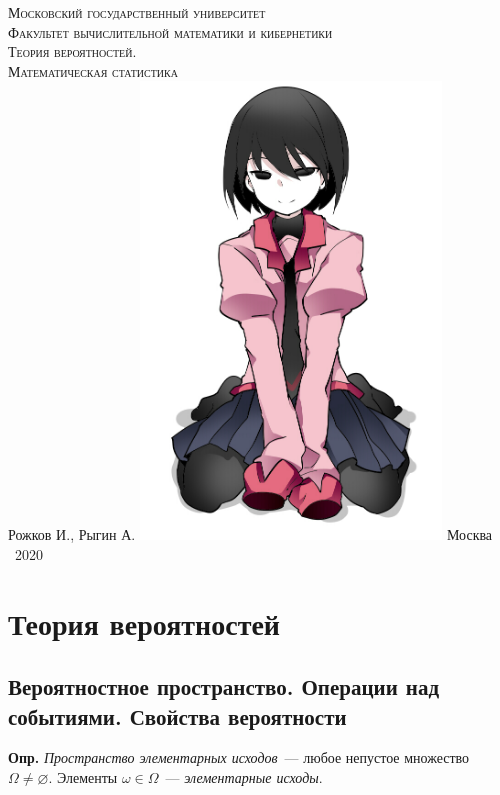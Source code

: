 \documentclass[oneside,final,14pt]{extreport}
\newcommand\mydef{{\bf Опр.}}
\theoremstyle{definition}
\begin{document}
\begin{titlepage}
    \centering
    \vfill
    {\scshape\large
        Московский государственный университет\\
        Факультет вычислительной математики и кибернетики\\
    }
    \vskip1cm
    {\scshape\huge
        Теория вероятностей.\\
        Математическая статистика\\
    }
    \vskip0.5cm
    {\upshape\large
        Рожков И., Рыгин А.
    }    
    \vfill
    \includegraphics[width=8cm]{pic.png}
    \vfill
    {\upshape\large
        Москва\\
        ~2020
    }
\end{titlepage}

\tableofcontents
\chapter{Теория вероятностей}

\section{Вероятностное пространство. Операции над событиями. Свойства вероятности}
\mydef{} {\it Пространство элементарных исходов}~--- любое непустое множество \( \Omega \ne \varnothing \). Элементы \( \omega \in \Omega \)~--- {\it элементарные исходы}.
\end{document}
